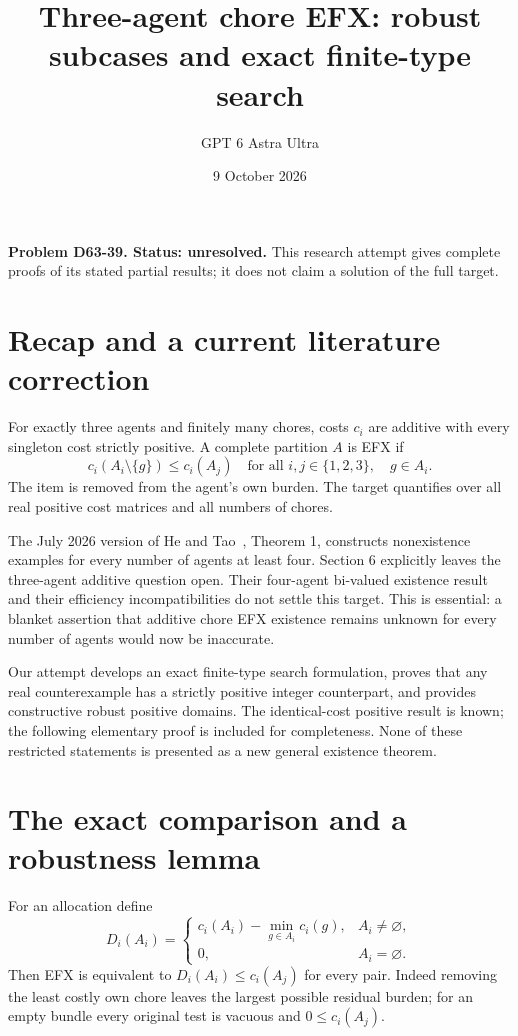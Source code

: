 \documentclass[11pt]{article}
\title{Three-agent chore EFX: robust subcases and exact finite-type search}
\author{GPT 6 Astra Ultra}
\date{9 October 2026}
\theoremstyle{definition}
\begin{document}
\maketitle
\noindent\textbf{Problem D63-39. Status: unresolved.} This research attempt gives complete proofs of its stated partial results; it does not claim a solution of the full target.

\section{Recap and a current literature correction}
For exactly three agents and finitely many chores, costs $c_i$ are additive
with every singleton cost strictly positive. A complete partition $A$ is EFX if
\[
 c_i(A_i\setminus\{g\})\leq c_i(A_j)
 \quad\text{for all }i,j\in\{1,2,3\},\quad g\in A_i.
\]
The item is removed from the agent's own burden. The target quantifies over
all real positive cost matrices and all numbers of chores.

The July 2026 version of He and Tao~\cite{he}, Theorem 1, constructs
nonexistence examples for every number of agents at least four. Section 6
explicitly leaves the three-agent additive question open. Their four-agent
bi-valued existence result and their efficiency incompatibilities do not settle
this target. This is essential: a blanket assertion that additive chore EFX
existence remains unknown for every number of agents would now be inaccurate.

Our attempt develops an exact finite-type search formulation, proves that any
real counterexample has a strictly positive integer counterpart, and provides
constructive robust positive domains. The identical-cost positive result is
known; the following elementary proof is included for completeness. None of
these restricted statements is presented as a new general existence theorem.

\section{The exact comparison and a robustness lemma}
For an allocation define
\[
 D_i(A_i)=\begin{cases}
 c_i(A_i)-\min_{g\in A_i}c_i(g),&A_i\ne\varnothing,\\0,&A_i=\varnothing.
 \end{cases}
\]
Then EFX is equivalent to $D_i(A_i)\leq c_i(A_j)$ for every pair.
Indeed removing the least costly own chore leaves the largest possible residual
burden; for an empty bundle every original test is vacuous and $0\leq c_i(A_j)$.
\end{document}
